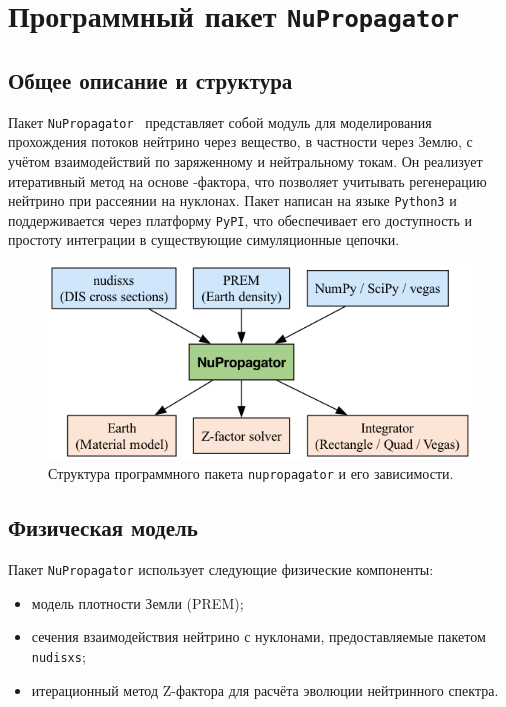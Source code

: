 \section{Программный пакет \texttt{NuPropagator}}

\subsection{Общее описание и структура}

Пакет \texttt{NuPropagator}~\cite{nupropagator2022} представляет собой модуль для моделирования прохождения потоков нейтрино через вещество, в частности через Землю, с учётом взаимодействий по заряженному и нейтральному токам. Он реализует итеративный метод на основе -фактора, что позволяет учитывать регенерацию нейтрино при рассеянии на нуклонах. Пакет написан на языке \texttt{Python3} и поддерживается через платформу \texttt{PyPI}, что обеспечивает его доступность и простоту интеграции в существующие симуляционные цепочки.

\begin{figure}[!h]
\centering
\includegraphics[width=\linewidth]{images/nupropagator_diagram.png}
\caption{Структура программного пакета \texttt{nupropagator} и его зависимости.}
\label{fig:nudisxs1}
\end{figure}

\subsection{Физическая модель}

Пакет \texttt{NuPropagator} использует следующие физические компоненты:
\begin{itemize}
  \item модель плотности Земли (PREM);
  \item сечения взаимодействия нейтрино с нуклонами, предоставляемые пакетом \texttt{nudisxs};
  \item итерационный метод Z-фактора для расчёта эволюции нейтринного спектра.
\end{itemize}

